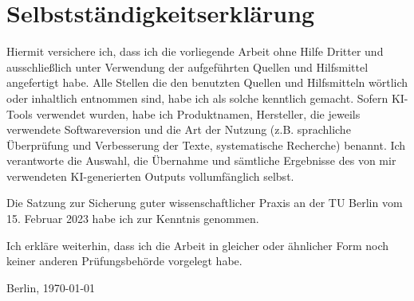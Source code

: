 \newpage

\section*{Selbstständigkeitserklärung}

\noindent
Hiermit versichere ich, dass ich die vorliegende Arbeit ohne Hilfe Dritter und ausschließlich unter Verwendung der aufgeführten Quellen und Hilfsmittel angefertigt habe.
Alle Stellen die den benutzten Quellen und
Hilfsmitteln wörtlich oder inhaltlich entnommen sind, habe ich als solche kenntlich gemacht.
Sofern KI-Tools verwendet wurden, habe ich Produktnamen, Hersteller, die jeweils verwendete Softwareversion und die Art der Nutzung (z.B. sprachliche Überprüfung und Verbesserung der Texte, systematische Recherche) benannt.
Ich verantworte die Auswahl, die Übernahme und sämtliche Ergebnisse des von mir verwendeten KI-generierten Outputs vollumfänglich selbst.


Die Satzung zur Sicherung guter wissenschaftlicher Praxis an der TU Berlin vom 15. Februar 2023 habe ich zur Kenntnis genommen.

Ich erkläre weiterhin, dass ich die Arbeit in gleicher oder ähnlicher Form noch keiner anderen Prüfungsbehörde vorgelegt habe.
\vspace{2cm}

\noindent
Berlin, \today

\vspace{3cm}

\begin{flushright}
    \hspace*{6cm}%
\dotfill\\

\textit{\tAuthor}

\end{flushright}
